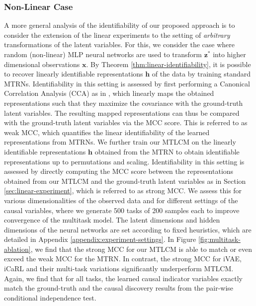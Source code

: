 \documentclass[nohyperref]{article}
\theoremstyle{plain}
\theoremstyle{definition}
\theoremstyle{remark}
\begin{document}
\subsubsection{Non-Linear Case}\label{sec:nonlinear-experiment}
A more general analysis of the identifiability of our proposed approach is to consider the extension of the linear experiments to the setting of \textit{arbitrary} transformations of the latent variables. For this, we consider the case where random (non-linear) MLP neural networks are used to transform $\mathbf{z}^*$ into higher dimensional observations $\mathbf{x}$.
By Theorem \ref{thm:linear-identifiability}, it is possible to recover linearly identifiable representations $\mathbf{h}$ of the data by training standard MTRNs. Identifiability in this setting is assessed by first 
performing a Canonical Correlation Analysis (CCA) as in \citet{Roeder_Metz_Kingma_2021}, which linearly maps the obtained representations such that they maximize the covariance with the ground-truth latent variables. The resulting mapped representations can thus be 
compared with the ground-truth latent variables via the MCC score. 
This is referred to as weak MCC, which quantifies the linear identifiability of the learned representations from MTRNs.
We further train our MTLCM on the linearly identifiable representations $\mathbf{h}$ obtained from the MTRN to obtain identifiable representations up to permutations and scaling. Identifiability in this setting is assessed by directly computing the MCC score between the representations obtained from our MTLCM and the ground-truth latent variables as in Section \ref{sec:linear-experiment}, which is referred to as strong MCC.
We assess this for various dimensionalities of the observed data
and for different settings of the causal variables, where we generate 500 tasks of 200 samples each to improve convergence of the multitask model. The latent dimensions and hidden dimensions of the neural networks are set according to fixed heuristics, which are detailed in Appendix \ref{appendix:experiment-settings}.
In Figure \ref{fig:multitask-ablation}, we find that the strong MCC for our MTLCM is able to match or even exceed the weak MCC for the MTRN.
In contrast, the strong MCC for iVAE, iCaRL and their multi-task variations significantly underperform MTLCM. Again, we find that for all tasks, the learned causal indicator variables exactly match the ground-truth and the causal discovery results from the pair-wise conditional independence test.
\end{document}
